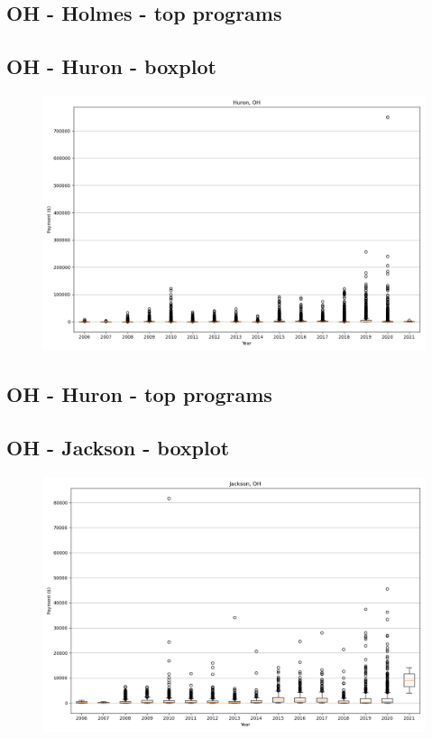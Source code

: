 \subsection*{OH - Holmes - top programs}

\newpage
\subsection*{OH - Huron - boxplot}
\begin{figure}[h]
\centering
\includegraphics[width=7in]{../output/boxplots/counties/Huron-OH_boxplot.png}
\end{figure}


\subsection*{OH - Huron - top programs}

\newpage
\subsection*{OH - Jackson - boxplot}
\begin{figure}[h]
\centering
\includegraphics[width=7in]{../output/boxplots/counties/Jackson-OH_boxplot.png}
\end{figure}


